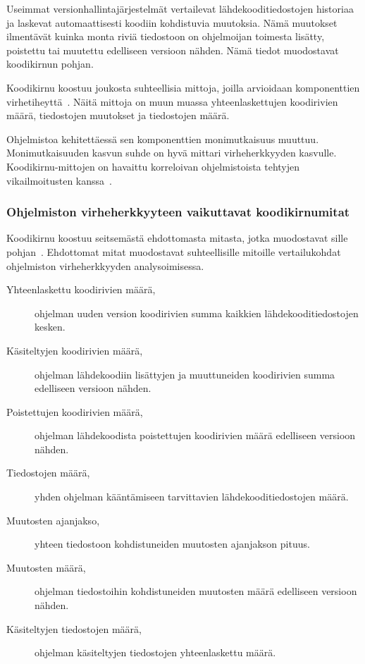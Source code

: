 \documentclass[finnish]{../tktltiki2}
\theoremstyle{definition}
\theoremstyle{remark}
\begin{document}
    Useimmat versionhallintajärjestelmät vertailevat lähdekooditiedos\-tojen historiaa ja laskevat automaattisesti 
koodiin kohdistuvia muutoksia. Nämä muutokset ilmentävät kuinka monta riviä tiedostoon on ohjelmoijan toimesta lisätty, 
poistettu tai muutettu edelliseen versioon nähden. Nämä tiedot muodostavat koodikirnun pohjan.

    Koodikirnu koostuu joukosta suhteellisia mittoja, joilla arvioidaan komponenttien virhetiheyttä~\cite{NB05}. Näitä 
mittoja on muun muassa yhteenlaskettujen koodirivien määrä, tiedostojen muutokset ja tiedostojen määrä.

    Ohjelmistoa kehitettäessä sen komponenttien monimutkaisuus muuttuu. Monimutkaisuuden kasvun suhde on hyvä mittari 
virheherkkyyden kasvulle. Koodikirnu-mittojen on havaittu korreloivan ohjelmistoista tehtyjen vikailmoitusten 
kanssa~\cite{NB05}.

\subsubsection{Ohjelmiston virheherkkyyteen vaikuttavat koodikirnumitat}

Koodikirnu koostuu seitsemästä ehdottomasta mitasta, jotka muodostavat sille pohjan~\cite{NB05}. Ehdottomat mitat 
muodostavat suhteellisille mitoille vertailukohdat ohjelmiston virheherkkyyden analysoimisessa.

\begin{description}
    
    \item[Yhteenlaskettu koodirivien määrä,] ohjelman uuden version koodirivien summa kaikkien lähdekooditiedostojen 
                                             kesken.
    
    \item[Käsiteltyjen koodirivien määrä,] ohjelman lähdekoodiin lisättyjen ja muuttuneiden koodirivien summa 
                                           edelliseen versioon nähden.
    
    \item[Poistettujen koodirivien määrä,] ohjelman lähdekoodista poistettujen koodirivien määrä edelliseen versioon 
                                           nähden.
    
    \item[Tiedostojen määrä,] yhden ohjelman kääntämiseen tarvittavien lähdekoodi\-tiedostojen määrä.
    
    \item[Muutosten ajanjakso,] yhteen tiedostoon kohdistuneiden muutosten ajanjakson pituus.
    
    \item[Muutosten määrä,] ohjelman tiedostoihin kohdistuneiden muutosten määrä edelliseen versioon nähden.
    
    \item[Käsiteltyjen tiedostojen määrä,] ohjelman käsiteltyjen tiedostojen yhteenlaskettu määrä.

\end{description}
\end{document}
